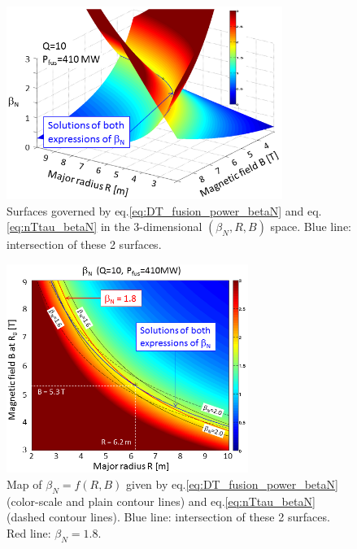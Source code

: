 \begin{figure} 
	\begin{center}
		\includegraphics[width=0.8\textwidth]{figures/Fig_3D_betaN_R_B_ITER.png}
		\caption{Surfaces governed by eq.\ref{eq:DT_fusion_power_betaN} and eq.\ref{eq:nTtau_betaN} in the 
			3-dimensional $(\beta_N,R,B)$ space. Blue line: intersection of these 2 surfaces.}
		\label{fig:R_B_betaN_3D}
	\end{center}
\end{figure}

\begin{figure} 
	\begin{center}
		\includegraphics[width=0.7\textwidth]{figures/Fig_2D_betaN_R_B_ITER.png}%
		\caption{Map of $\beta_N=f(R,B)$ given by eq.\ref{eq:DT_fusion_power_betaN} (color-scale and plain contour lines) and eq.\ref{eq:nTtau_betaN} (dashed contour lines). Blue line: intersection of these 2 surfaces. Red line: $\beta_N = 1.8$.}
		\label{fig:R_B_betaN_2D}
	\end{center}
\end{figure}


